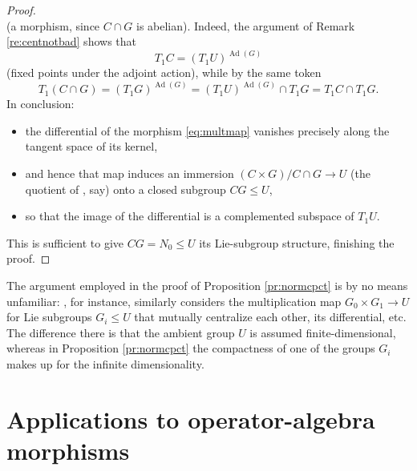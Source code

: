 \documentclass[pdftex]{sigma}
\numberwithin{equation}{section}
\begin{document}
\begin{proof}
\begin{equation*}
 \end{equation*}
 (a morphism, since $C\cap G$ is abelian). Indeed, the argument of Remark \ref{re:centnotbad} shows that
 \begin{equation*}
 T_1C = (T_1U)^{\operatorname{Ad}(G)}
 \end{equation*}
 (fixed points under the adjoint action), while by the same token
 \begin{equation*}
 T_1(C\cap G) = (T_1G)^{\operatorname{Ad}(G)} = (T_1U)^{\operatorname{Ad}(G)}\cap T_1G = T_1C\cap T_1G.
 \end{equation*}
 In conclusion:
 \begin{itemize}\itemsep=0pt
 \item the differential of the morphism \eqref{eq:multmap} vanishes precisely along the tangent space of its kernel,
 \item and hence that map induces an immersion $(C\times G)/C\cap G\to U$ (the quotient of \cite[Section~III.1.6, Proposition 11\,(ii)]{bourb-lie-13}, say) onto a closed subgroup ${CG\le U}$,
 \item so that the image of the differential is a complemented subspace of $T_1U$.
 \end{itemize}
 This is sufficient to give $CG=N_0\le U$ its Lie-subgroup structure, finishing the proof.
\end{proof}

\begin{Remark}\label{re:isothmbourb}
 The argument employed in the proof of Proposition \ref{pr:normcpct} is by no means unfamiliar: \cite[Section~III.3.8, Proposition 30]{bourb-lie-13}, for instance, similarly considers the multiplication map $G_0\times G_1\to U$ for Lie subgroups $G_i\le U$ that mutually centralize each other, its differential, etc. The difference there is that the ambient group $U$ is assumed finite-dimensional, whereas in Proposition \ref{pr:normcpct} the compactness of one of the groups $G_i$ makes up for the infinite dimensionality.
\end{Remark}

\section{Applications to operator-algebra morphisms}\label{se:oaapp}

\end{document}
